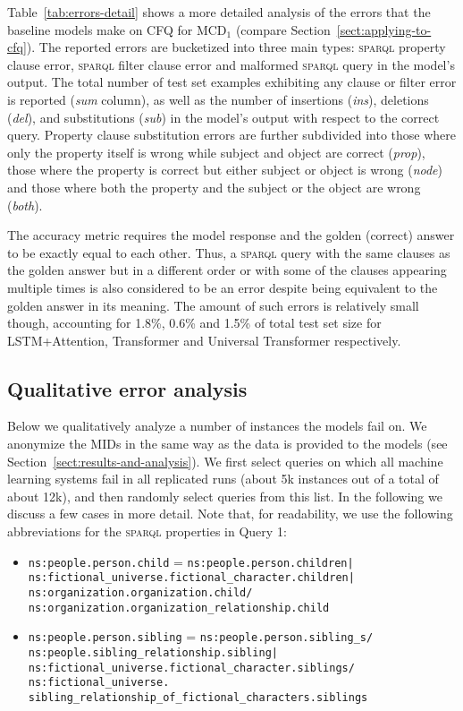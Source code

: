 \documentclass[letterpaper]{article}
\newcommand{\SPARQL}{\textsc{sparql}}
\newcommand{\MCD}[1]{MCD$_{#1}$}
\begin{document}
Table~\ref{tab:errors-detail} shows a more detailed analysis of the errors that the baseline models make on CFQ for \MCD{1} (compare Section~\ref{sect:applying-to-cfq}). The reported errors are bucketized into three main types: \SPARQL{} property clause error, \SPARQL{} filter clause error and malformed \SPARQL{} query in the model's output. The total number of test set examples exhibiting any clause or filter error is reported (\textit{sum} column), as well as the number of insertions (\textit{ins}), deletions (\textit{del}), and substitutions (\textit{sub}) in the model's output with respect to the correct query. Property clause substitution errors are further subdivided into those where only the property itself is wrong while subject and object are correct (\textit{prop}), those where the property is correct but either subject or object is wrong (\textit{node}) and those where both the property and the subject or the object are wrong (\textit{both}).

The accuracy metric requires the model response and the golden (correct) answer to be exactly equal to each other. Thus, a \SPARQL{} query with the same clauses as the golden answer but in a different order or with some of the clauses appearing multiple times is also considered to be an error despite being equivalent to the golden answer in its meaning. The amount of such errors is relatively small though, accounting for 1.8\%, 0.6\% and 1.5\% of total test set size for LSTM+Attention, Transformer and Universal Transformer respectively.

\subsection{Qualitative error analysis}

Below we qualitatively analyze a number of instances the models fail on. We anonymize the MIDs in the same way as the data is provided to the models (see Section~\ref{sect:results-and-analysis}). We first select queries on which all machine learning systems fail in all replicated runs (about 5k instances out of a total of about 12k), and then randomly select queries from this list. In the following we discuss a few cases in more detail. Note that, for readability, we use the following abbreviations for the \SPARQL{} properties in Query 1:
\begin{itemize}
    \item \texttt{ns:people.person.child} = \texttt{ns:people.person.children|\\ns:fictional\_universe.fictional\_character.children|\\ns:organization.organization.child/\\ns:organization.organization\_relationship.child}
    \item \texttt{ns:people.person.sibling} = \texttt{ns:people.person.sibling_s/\\ns:people.sibling_relationship.sibling|\\ns:fictional_universe.fictional_character.siblings/\\ns:fictional_universe.\\sibling_relationship_of_fictional_characters.siblings}
\end{itemize}
\end{document}
